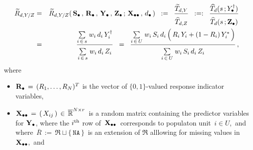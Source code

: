 \begin{itemize}
    \begin{eqnarray*}
    \widetilde{R}_{d,Y/Z}
    & = &
        \widetilde{R}_{d,Y/Z}(\,
            \Sdot\,,\,
            \Rdot\,,\,
            \Ydot\,,\,
            \Zdot\,;\,
            \Xdotdot\,,\,
            \dbullet
            \,)
    \;\; := \;\;
        \dfrac{
            \widetilde{T}_{d,Y}
            }{
            \overset{{\color{white}.}}{
                \widehat{T}_{d,Z}
                }
            }
    \;\; :=: \;\;
        \dfrac{
            \widehat{T}_{d}(s\,;Y^{\dagger}_{\bullet})
            }{
            \overset{{\color{white}.}}{
                \widehat{T}_{d}(s\,;\Zdot)
                }
            }
    \\
    & = &
        \dfrac{
            \underset{i\,\in\,s}{\sum}\;w_{i}\,d_{i}\,Y^{\dagger}_{i}
            }{
            \overset{{\color{white}.}}{
                \underset{i\,\in\,s}{\sum}\;w_{i}\,d_{i}\,Z_{i}
                }
            }
    \;\; = \;\;
        \dfrac{
            \underset{i\,\in\,U}{\sum}\;w_{i}\,S_{i}\,d_{i}\left(\,
                R_{i}\,Y_{i}
                \overset{{\color{white}.}}{+}
                (1-R_{i})\,Y^{*}_{i}
                \,\right)
            }{
            \overset{{\color{white}.}}{
                \underset{i\,\in\,U}{\sum}\;w_{i}\,S_{i}\,d_{i}\,Z_{i}
                }
            }\,,
    \end{eqnarray*}
    where
    \begin{itemize}
    \item
        $\mathbf{R}_{\bullet} \,=\, (R_{1},\ldots,R_{N})^{T}$ is the vector of $\{0,1\}$-valued response indicator variables,
    \item
        $\mathbf{X}_{\bullet\bullet} \,=\, \left(\,X_{ij}\,\right) \,\in\, \overline{\mathbb{R}}^{N \times r}$\,
        is a random matrix containing the predictor variables for $\mathbf{Y}_{\bullet}$,
        where the $i^{\textnormal{th}}$ row of \,$\mathbf{X}_{\bullet\bullet}$\, corresponds to populaton unit \,$i \in U$,\,
        and where \,$\overline{R} \,:=\, \Re \sqcup \{\,\texttt{NA}\,\}$\,
        is an extension of $\Re$ alllowing for missing values in \,$\mathbf{X}_{\bullet\bullet}$,\, and

\end{itemize}
\end{itemize}
